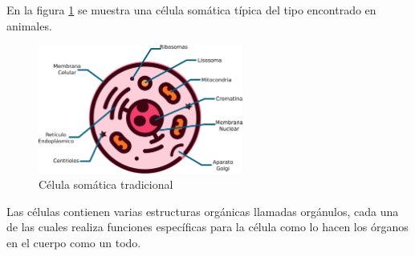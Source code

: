 \documentclass[]{article}
\begin{document}

En la figura \ref{celula} se muestra una célula somática típica del tipo encontrado en animales.\\

\begin{figure}[h!]
	\centering
	\includegraphics[width=0.6\textwidth]{celula.png}
	\caption{Célula somática tradicional}
		\label{celula}
\end{figure}





\begin{figure}
	\begin{minipage}[t][3.5cm]{\textwidth}
		\begin{center}
			\smartdiagramset{
				back arrow disabled=true,
				additions={
					additional item offset=0.85cm,
					additional item border color=blue,
				}
			}
		\end{center}
	\end{minipage}
   \caption{}
   \label{tiposCelulas}
\end{figure}


Las células contienen varias estructuras orgánicas llamadas orgánulos, cada una de las cuales realiza funciones específicas para la célula como lo hacen los órganos en el cuerpo como un todo.\\
\end{document}

